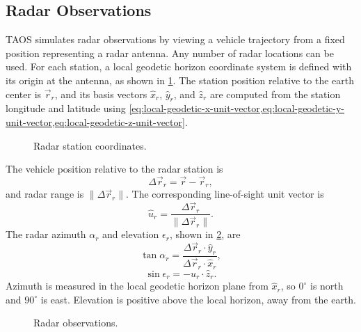 \subsection{Radar Observations}\label{sec:radar-observations}

TAOS simulates radar observations by viewing a vehicle trajectory from a fixed
position representing a radar antenna. Any number of radar locations can be used.
For each station, a local geodetic horizon coordinate system is defined with its
origin at the antenna, as shown in \cref{fig:radar-station-coordinates}. The
station position relative to the earth center is $\vec r_r$, and its basis vectors
$\hat x_r$, $\hat y_r$, and $\hat z_r$ are computed from the station longitude and
latitude using \cref{eq:local-geodetic-x-unit-vector,eq:local-geodetic-y-unit-vector,eq:local-geodetic-z-unit-vector}.

\begin{figure}[htbp]
  \centering
  \resizebox{0.72\linewidth}{!}{}
  \caption{Radar station coordinates.}
  \label{fig:radar-station-coordinates}
\end{figure}

The vehicle position relative to the radar station is
\begin{equation}
  \Delta\vec r_r=\vec r-\vec r_r,
  \label{eq:radar-relative-position}
\end{equation}
and radar range is $\lVert\Delta\vec r_r\rVert$. The corresponding line-of-sight
unit vector is
\begin{equation}
  \hat u_r=\frac{\Delta\vec r_r}{\lVert\Delta\vec r_r\rVert}.
  \label{eq:radar-line-of-sight-unit-vector}
\end{equation}
The radar azimuth $\alpha_r$ and elevation $\epsilon_r$, shown in
\cref{fig:radar-observations}, are
\begin{equation}
  \tan\alpha_r
  =\frac{\Delta\vec r_r\cdot\hat y_r}
         {\Delta\vec r_r\cdot\hat x_r},
  \label{eq:radar-azimuth}
\end{equation}
\begin{equation}
  \sin\epsilon_r=-\hat u_r\cdot\hat z_r.
  \label{eq:radar-elevation}
\end{equation}
Azimuth is measured in the local geodetic horizon plane from $\hat x_r$, so
$0^\circ$ is north and $90^\circ$ is east. Elevation is positive above the local
horizon, away from the earth.

\begin{figure}[htbp]
  \centering
  \resizebox{0.70\linewidth}{!}{}
  \caption{Radar observations.}
  \label{fig:radar-observations}
\end{figure}

